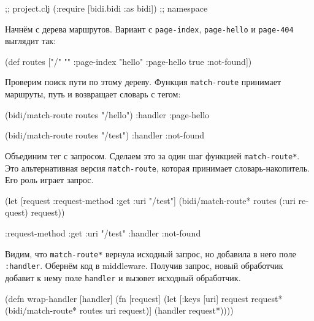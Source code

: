 \begin{english}
  \begin{clojure}
[bidi "2.1.5"]                  ;; project.clj
(:require [bidi.bidi :as bidi]) ;; namespace
  \end{clojure}
\end{english}

Начнём с дерева маршрутов. Вариант с \verb|page-index|, \verb|page-hello| и
\verb|page-404| выглядит так:

\begin{english}
  \begin{clojure}
(def routes
  ["/" {""      :page-index
        "hello" :page-hello
        true    :not-found}])
  \end{clojure}
\end{english}


Проверим поиск пути по этому дереву. Функция \verb|match-route| принимает
маршруты, путь и возвращает словарь с тегом:

\begin{english}
  \begin{clojure}
(bidi/match-route routes "/hello")
{:handler :page-hello}

(bidi/match-route routes "/test")
{:handler :not-found}
  \end{clojure}
\end{english}


Объединим тег с запросом. Сделаем это за один шаг функцией
\verb|match-route*|. Это альтернативная версия \verb|match-route|, которая
принимает словарь-накопитель. Его роль играет запрос.

\begin{english}
  \begin{clojure}
(let [request {:request-method :get
               :uri "/test"}]
  (bidi/match-route* routes (:uri request) request))

{:request-method :get
 :uri "/test"
 :handler :not-found}
  \end{clojure}
\end{english}

Видим, что \verb|match-route*| вернула исходный запрос, но добавила в него
поле \verb|:handler|. Обернём код в middleware. Получив запрос, новый
обработчик добавит к нему поле \verb|handler| и вызовет исходный обработчик.

\begin{english}
  \begin{clojure}
(defn wrap-handler [handler]
  (fn [request]
    (let [{:keys [uri]} request
          request* (bidi/match-route* routes uri request)]
      (handler request*))))
  \end{clojure}
\end{english}

